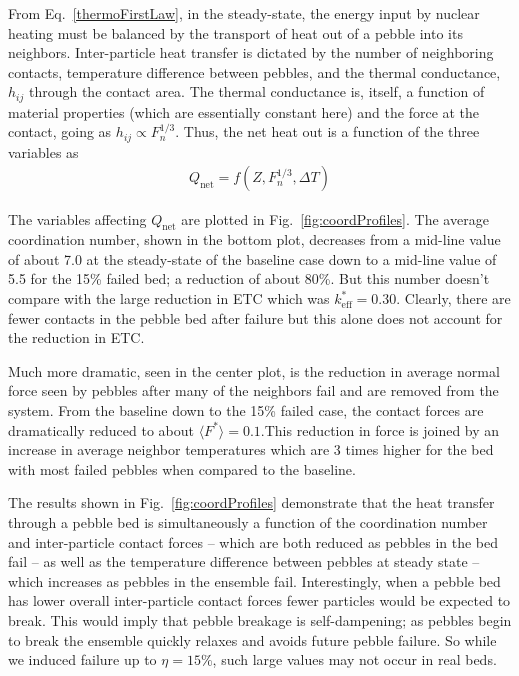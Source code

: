 From Eq.~\ref{thermoFirstLaw}, in the steady-state, the energy input by nuclear heating must be balanced by the transport of heat out of a pebble into its neighbors. Inter-particle heat transfer is dictated by the number of neighboring contacts, temperature difference between pebbles, and the thermal conductance, $h_{ij}$ through the contact area. The thermal conductance is, itself, a function of material properties  (which are essentially constant here) and the force at the contact, going as $h_{ij} \propto F_n^{1/3}$. Thus, the net heat out is a function of the three variables as
\begin{align}
Q_\text{net} =f( Z, F_n^{1/3}, \Delta T)
\end{align}



The variables affecting $Q_\text{net}$ are plotted in Fig.~\ref{fig:coordProfiles}. The average coordination number, shown in the bottom plot, decreases from a mid-line value of about 7.0 at the steady-state of the baseline case down to a mid-line value of 5.5 for the 15\% failed bed; a reduction of about 80\%. But this number doesn't compare with the large reduction in ETC which was $k_\text{eff}^*=0.30$. Clearly, there are fewer contacts in the pebble bed after failure but this alone does not account for the reduction in ETC.

Much more dramatic, seen in the center plot, is the reduction in average normal force seen by pebbles after many of the neighbors fail and are removed from the system. From the baseline down to the 15\% failed case, the contact forces are dramatically reduced to about $\langle F^* \rangle=0.1$.This reduction in force is joined by an increase in average neighbor temperatures which are 3 times higher for the bed with most failed pebbles when compared to the baseline. 

The results shown in Fig.~\ref{fig:coordProfiles} demonstrate that the heat transfer through a pebble bed is simultaneously a function of the coordination number and inter-particle contact forces -- which are both reduced as pebbles in the bed fail -- as well as the temperature difference between pebbles at steady state -- which increases as pebbles in the ensemble fail. Interestingly, when a pebble bed has lower overall inter-particle contact forces fewer particles would be expected to break. This would imply that pebble breakage is self-dampening; as pebbles begin to break the ensemble quickly relaxes and avoids future pebble failure. So while we induced failure up to $\eta = 15\%$, such large values may not occur in real beds. 

